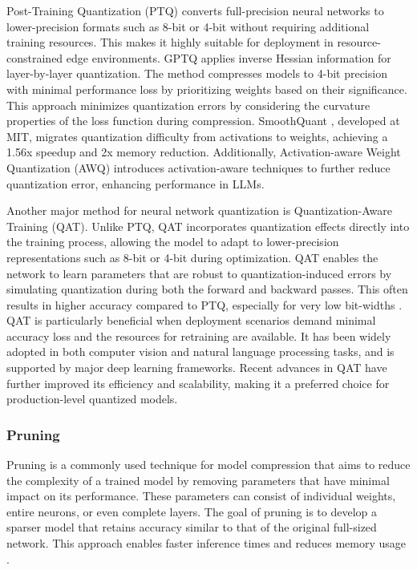 \documentclass[11pt]{IEEEtran}
\begin{document}
Post-Training Quantization (PTQ) converts full-precision neural networks to lower-precision formats such as 8-bit or 4-bit without requiring additional training resources. This makes it highly suitable for deployment in resource-constrained edge environments. GPTQ \cite{b15} applies inverse Hessian information for layer-by-layer quantization. The method compresses models to 4-bit precision with minimal performance loss by prioritizing weights based on their significance. This approach minimizes quantization errors by considering the curvature properties of the loss function during compression. SmoothQuant \cite{b16}, developed
at MIT, migrates quantization difficulty from activations to weights, achieving a 1.56x speedup and 2x memory reduction. Additionally, Activation-aware Weight Quantization (AWQ) \cite{b17} introduces activation-aware techniques to further reduce quantization error, enhancing performance in LLMs.

Another major method for neural network quantization is Quantization-Aware Training (QAT). Unlike PTQ, QAT incorporates quantization effects directly into the training process, allowing the model to adapt to lower-precision representations such as 8-bit or 4-bit during optimization. QAT enables the network to learn parameters that are robust to quantization-induced errors by simulating quantization during both the forward and backward passes. This often results in higher accuracy compared to PTQ, especially for very low bit-widths \cite{b18}. QAT is particularly beneficial when deployment scenarios demand minimal accuracy loss and the resources for retraining are available. It has been widely adopted in both computer vision and natural language processing tasks, and is supported by major deep learning frameworks. Recent advances in QAT have further improved its efficiency and scalability, making it a preferred choice for production-level quantized models.

\subsubsection{Pruning}
Pruning is a commonly used technique for model compression that aims to reduce the
complexity of a trained model by removing parameters that have minimal impact on its
performance. These parameters can consist of individual weights, entire neurons, or even
complete layers. The goal of pruning is to develop a sparser model that retains accuracy similar to that of the original full-sized network. This approach enables faster inference times and reduces memory usage \cite{b7}.
\end{document}
